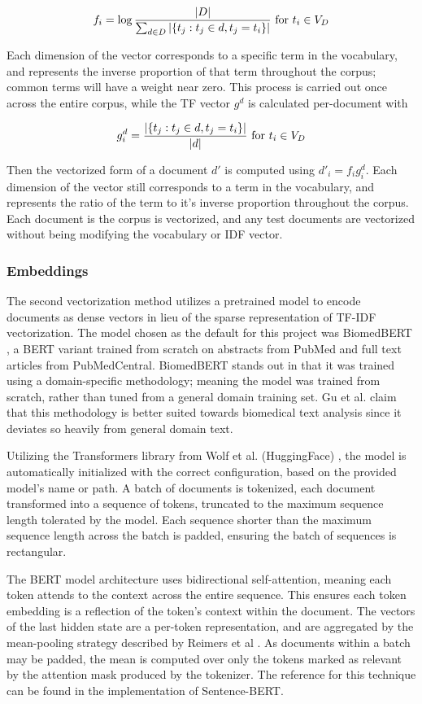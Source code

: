 \documentclass[11pt]{article} %
\theoremstyle{plain}
\theoremstyle{definition}
\begin{document}
\[f_i = \log{ \frac{ |D| }{ \sum_{ d \in D} |\{ t_j : t_j \in d , t_j = t_i\}| } } \textnormal{ for } t_i \in V_D \]

Each dimension of the vector corresponds to a specific term in the vocabulary, and represents the inverse proportion of that term throughout the corpus; common terms will have a weight near zero. This process is carried out once across the entire corpus, while the TF vector \(g^d\) is calculated per-document with

\[g_i^d = \frac{|\{ t_j : t_j \in d, t_j = t_i \}|}{|d|} \textnormal{ for } t_i \in V_D\]

Then the vectorized form of a document \(d'\) is computed using \(d'_i = f_ig^d_i \). Each dimension of the vector still corresponds to a term in the vocabulary, and represents the ratio of the term to it's inverse proportion throughout the corpus.  Each document is the corpus is vectorized, and any test documents are vectorized without being modifying the vocabulary or IDF vector.

\subsubsection{Embeddings}

The second vectorization method utilizes a pretrained model to encode documents as dense vectors in lieu of the sparse representation of TF-IDF vectorization. The model chosen as the default for this project was BiomedBERT \cite{gu/2021/domainspecific}, a BERT \cite{devlin/2018/bert} variant trained from scratch on abstracts from PubMed and full text articles from PubMedCentral. BiomedBERT stands out in that it was trained using a domain-specific methodology; meaning the model was trained from scratch, rather than tuned from a general domain training set. Gu et al. claim that this methodology is better suited towards biomedical text analysis since it deviates so heavily from general domain text.

Utilizing the Transformers library from Wolf et al. (HuggingFace) \cite{wolf/2020/transformers}, the model is automatically initialized with the correct configuration, based on the provided model's name or path. A batch of documents is tokenized, each document transformed into a sequence of tokens, truncated to the maximum sequence length tolerated by the model. Each sequence shorter than the maximum sequence length across the batch is padded, ensuring the batch of sequences is rectangular.

The BERT model architecture uses bidirectional self-attention, meaning each token attends to the context across the entire sequence. This ensures each token embedding is a reflection of the token's context within the document.  The vectors of the last hidden state are a per-token representation, and are aggregated by the mean-pooling strategy described by Reimers et al \cite{reimers/2019/sentence-bert}. As documents within a batch may be padded, the mean is computed over only the tokens marked as relevant by the attention mask produced by the tokenizer. \cite{wolf/2020/transformers} The reference for this technique can be found in the implementation of Sentence-BERT.
\end{document}
